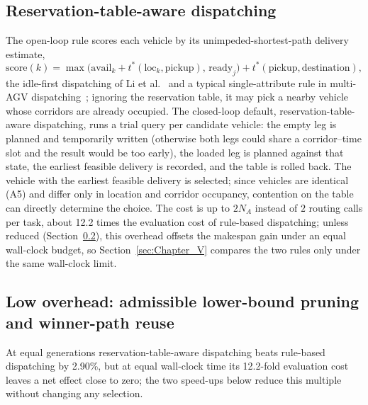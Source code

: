 \documentclass[manuscript,screen,review]{acmart}
\newcommand{\CostMultBefore}{12.2}
\newcommand{\GainProbeSameGen}{2.90\%}
\begin{document}
\subsection{Reservation-table-aware dispatching}
\label{sec:dispatch}

The open-loop rule scores each vehicle by its unimpeded-shortest-path delivery estimate,
\begin{equation}
\label{eq:rule}
\mathrm{score}(k)=\max\bigl(\mathrm{avail}_k+t^{*}(\mathrm{loc}_k,\text{pickup}),\,
\mathrm{ready}_j\bigr)+t^{*}(\text{pickup},\text{destination}),
\end{equation}
the idle-first dispatching of Li et al.~\cite{li2026framework} and a typical single-attribute rule in multi-AGV dispatching~\cite{lu2022agv}; ignoring the reservation table, it may pick a nearby vehicle whose corridors are already occupied.
The closed-loop default, reservation-table-aware dispatching, runs a trial query per candidate vehicle: the empty leg is planned and temporarily written (otherwise both legs could share a corridor--time slot and the result would be too early), the loaded leg is planned against that state, the earliest feasible delivery is recorded, and the table is rolled back.
The vehicle with the earliest feasible delivery is selected; since vehicles are identical (A5) and differ only in location and corridor occupancy, contention on the table can directly determine the choice.
The cost is up to $2N_A$ instead of $2$ routing calls per task, about \CostMultBefore{} times the evaluation cost of rule-based dispatching; unless reduced (Section~\ref{sec:speedup}), this overhead offsets the makespan gain under an equal wall-clock budget, so Section~\ref{sec:Chapter_V} compares the two rules only under the same wall-clock limit.

\subsection{Low overhead: admissible lower-bound pruning and winner-path reuse}
\label{sec:speedup}

At equal generations reservation-table-aware dispatching beats rule-based dispatching by \GainProbeSameGen{}, but at equal wall-clock time its \CostMultBefore{}-fold evaluation cost leaves a net effect close to zero; the two speed-ups below reduce this multiple without changing any selection.
\end{document}
